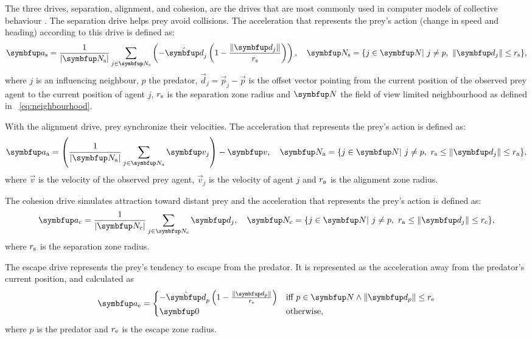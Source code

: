 The three drives, separation, alignment, and cohesion, are the drives that are most commonly used in computer models of collective behaviour \cite{reynolds1987flocks}. The separation drive helps prey avoid collisions. The acceleration that represents the prey's action (change in speed and heading) according to this drive is defined as:
%
\begin{equation}
\vec{a}_\textnormal{s}=\frac{1}{|\set{N}_\textnormal{s}|} \sum_{j \in \set{N}_\textnormal{s}}\left(-\uvec{d}_j\left(1-\frac{\|\vec{d}_j\|}{r_\textnormal{s}}\right)\right),\quad
\set{N}_\textnormal{s} = \{j \in \set{N}|\ j \neq p,\ \|\vec{d}_j\| \leq r_\textnormal{s} \},
\end{equation}
%
where $j$ is an influencing neighbour, $p$ the predator, $\vec{d}_j=\vec{p}_j-\vec{p}$ is the offset vector pointing from the current position of the observed prey agent to the current position of agent $j$, $r_\textnormal{s}$ is the separation zone radius and $\set{N}$ the field of view limited neighbourhood as defined in \eq~\eqref{eq:neighbourhood}.

With the alignment drive, prey synchronize their velocities. The acceleration that represents the prey's action is defined as:
%
\begin{equation}
\vec{a}_\textnormal{a}=\left(\frac{1}{|\set{N}_\textnormal{a}|} \sum_{j \in \set{N}_\textnormal{a}} \vec{v}_j\right)-\vec{v},\quad
\set{N}_\textnormal{a}=\{j \in \set{N}|\ j \neq p,\ r_\textnormal{s} \leq \|\vec{d}_j\| \leq r_\textnormal{a} \},
\end{equation}
%
where $\vec{v}$ is the velocity of the observed prey agent, $\vec{v}_j$ is the velocity of agent $j$ and $r_\textnormal{a}$ is the alignment zone radius.

The cohesion drive simulates attraction toward distant prey and the acceleration that represents the prey's action is defined as:
%
\begin{equation}
\vec{a}_\textnormal{c}=\frac{1}{|\set{N}_\textnormal{c}|} \sum_{j \in \set{N}_\textnormal{c}} \vec{d}_j,\quad \set{N}_\textnormal{c}=\{j \in \set{N}|\ j \neq p,\ r_\textnormal{a} \leq \|\vec{d}_j\| \leq r_\textnormal{c} \},
\end{equation}
%
where $r_\textnormal{s}$ is the separation zone radius.

The escape drive represents the prey's tendency to escape from the predator. It is represented as the acceleration away from the predator's current position, and calculated as
%
\begin{equation}
\vec{a}_\textnormal{e}=\begin{cases}
-\uvec{d}_p\left(1-\frac{\|\vec{d}_p\|}{r_\textnormal{e}}\right) & \textnormal{iff}\ p \in \set{N} \wedge \|\vec{d}_p\| \leq r_\textnormal{e}\\
\vec{0} & \textnormal{otherwise,}
\end{cases}
\end{equation}
%
where $p$ is the predator and $r_\textnormal{e}$ is the escape zone radius.


